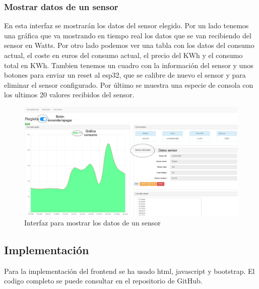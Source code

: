 \begin{titlepage}
\subsubsection{Mostrar datos de un sensor}
En esta interfaz se mostrarán los datos del sensor elegido. Por un lado tenemos una gráfica que va mostrando en tiempo real los datos que se van recibiendo del sensor en Watts. Por otro lado podemos ver una tabla con los datos del consumo actual, el coste en euros del consumo actual, el precio del KWh y el consumo total en KWh. Tambien tenemos un cuadro con la información del sensor y unos botones para enviar un reset al esp32, que se calibre de nuevo el sensor y para eliminar el sensor configurado. Por último se muestra una especie de consola con los ultimos 20 valores recibidos del sensor. 
\begin{figure}[h!]
	\centering
	\includegraphics[width=1\textwidth]{imagenes/web_datos.png}
	\caption{Interfaz para mostrar los datos de un sensor}
\end{figure}
\subsection{Implementación}
Para la implementación del frontend se ha usado html, javascript y bootstrap. El codigo completo se puede consultar en el repositorio de GitHub\cite{ref25}.


\end{titlepage}
